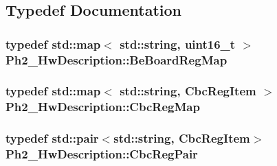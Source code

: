 \subsection{Typedef Documentation}
\hypertarget{namespace_ph2___hw_description_a2e13fb82c8ed98154c60f9d0f8467d72}{
\subsubsection[{Be\-Board\-Reg\-Map}]{\setlength{\rightskip}{0pt plus 5cm}typedef std\-::map$<$ std\-::string, uint16\-\_\-t $>$ {\bf Ph2\-\_\-\-Hw\-Description\-::\-Be\-Board\-Reg\-Map}}}\label{namespace_ph2___hw_description_a2e13fb82c8ed98154c60f9d0f8467d72}
\hypertarget{namespace_ph2___hw_description_a9a23b373068f169aa67ca1d22c9a6001}{
\subsubsection[{Cbc\-Reg\-Map}]{\setlength{\rightskip}{0pt plus 5cm}typedef std\-::map$<$ std\-::string, {\bf Cbc\-Reg\-Item} $>$ {\bf Ph2\-\_\-\-Hw\-Description\-::\-Cbc\-Reg\-Map}}}\label{namespace_ph2___hw_description_a9a23b373068f169aa67ca1d22c9a6001}
\hypertarget{namespace_ph2___hw_description_a78856413327152e693dceca249188d11}{
\subsubsection[{Cbc\-Reg\-Pair}]{\setlength{\rightskip}{0pt plus 5cm}typedef std\-::pair$<$std\-::string, {\bf Cbc\-Reg\-Item}$>$ {\bf Ph2\-\_\-\-Hw\-Description\-::\-Cbc\-Reg\-Pair}}}\label{namespace_ph2___hw_description_a78856413327152e693dceca249188d11}

